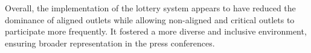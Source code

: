 Overall, the implementation of the lottery system appears to have reduced the dominance of aligned outlets while allowing non-aligned and critical outlets to participate more frequently. It fostered a more diverse and inclusive environment, ensuring broader representation in the press conferences.



